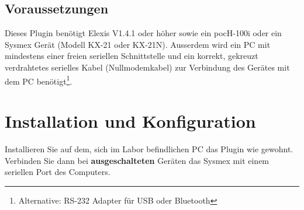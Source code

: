 \documentclass[a4paper]{scrartcl}
\begin{document}
\subsection{Voraussetzungen}
Dieses Plugin ben\"otigt Elexis V1.4.1 oder h\"oher sowie ein pocH-100i oder ein Sysmex Ger\"at (Modell KX-21 oder KX-21N). Ausserdem wird ein PC mit mindestens einer freien seriellen Schnittstelle und ein korrekt, gekreuzt verdrahtetes serielles Kabel (Nullmodemkabel) zur Verbindung des Ger\"ates mit dem PC ben\"otigt\footnote{Alternative: RS-232 Adapter f\"ur USB oder Bluetooth}.

\section{Installation und Konfiguration}
Installieren Sie auf dem, sich im Labor befindlichen PC das Plugin wie gewohnt. Verbinden Sie dann bei \textbf{ausgeschalteten} Ger\"aten das Sysmex mit einem seriellen Port des Computers. 
\end{document}
